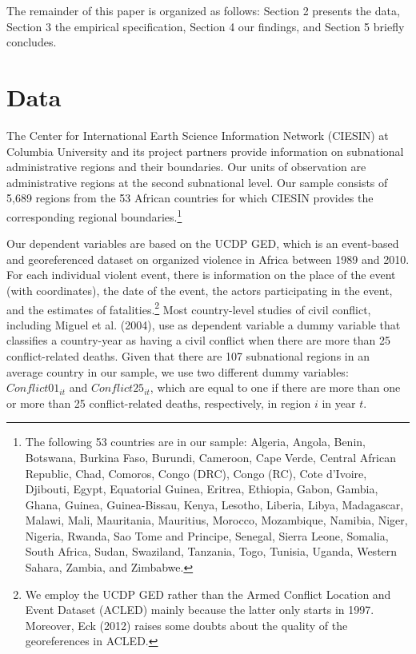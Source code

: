 \documentclass[10pt]{article}
\begin{document}
The remainder of this paper is organized as follows: Section 2 presents the data, Section 3 the empirical specification, Section 4 our findings, and Section 5 briefly concludes.

\section{Data}

The Center for International Earth Science Information Network (CIESIN) at Columbia University and its project partners provide information on subnational administrative regions and their boundaries. 
Our units of observation are administrative regions at the second subnational level. 
Our sample consists of 5,689 regions from the 53 African countries for which CIESIN provides the corresponding regional boundaries.\footnote{The following 53 countries are in our sample: Algeria, Angola, Benin, Botswana, Burkina Faso, Burundi, Cameroon, Cape Verde, Central African Republic, Chad, Comoros, Congo (DRC), Congo (RC), Cote d'Ivoire, Djibouti, Egypt, Equatorial Guinea, Eritrea, Ethiopia, Gabon, Gambia, Ghana, Guinea, Guinea-Bissau, Kenya, Lesotho, Liberia, Libya, Madagascar, Malawi, Mali, Mauritania, Mauritius, Morocco, Mozambique, Namibia, Niger, Nigeria, Rwanda, Sao Tome and Principe, Senegal, Sierra Leone, Somalia, South Africa, Sudan, Swaziland, Tanzania, Togo, Tunisia, Uganda, Western Sahara, Zambia, and Zimbabwe.}

Our dependent variables are based on the UCDP GED, which is an event-based and georeferenced dataset on organized violence in Africa between 1989 and 2010. 
For each individual violent event, there is information on the place of the event (with coordinates), the date of the event, the actors participating in the event, and the estimates of fatalities.\footnote{ We employ the UCDP GED rather than the Armed Conflict Location and Event Dataset (ACLED) mainly because the latter only starts in 1997. Moreover, Eck (2012) raises some doubts about the quality of the georeferences in ACLED.} 
Most country-level studies of civil conflict, including Miguel et al. (2004), use as dependent variable a dummy variable that classifies a country-year as having a civil conflict when there are more than 25 conflict-related deaths. 
Given that there are 107 subnational regions in an average country in our sample, we use two different dummy variables: $Conflict01_{i t}$ and $Conflict25_{i t}$, which are equal to one if there are more than one or more than 25 conflict-related deaths, respectively, in region $i$ in year $t$.
\end{document}
